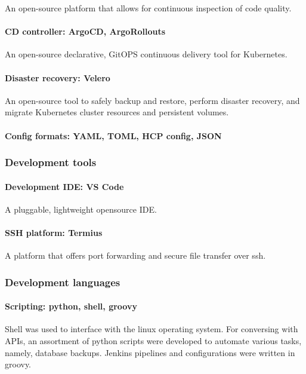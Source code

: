 An open-source platform that allows for continuous inspection of code quality. 

\paragraph{CD controller: ArgoCD, ArgoRollouts }

An open-source declarative, GitOPS continuous delivery tool for Kubernetes. 

\paragraph{Disaster recovery: Velero }

An open-source tool to safely backup and restore, perform disaster recovery, and migrate Kubernetes cluster resources and persistent volumes. 

\paragraph{Config formats: YAML, TOML, HCP config, JSON }

\subsubsection{Development tools }

\paragraph{Development IDE: VS Code }

A pluggable, lightweight opensource IDE. 

\paragraph{SSH platform: Termius }

A platform that offers port forwarding and secure file transfer over ssh. 

\subsubsection{Development languages }

\paragraph{Scripting: python, shell, groovy }

Shell was used to interface with the linux operating system. For conversing with APIs, an assortment of python scripts were developed to automate various tasks, namely, database backups. Jenkins pipelines and configurations were written in groovy. 

